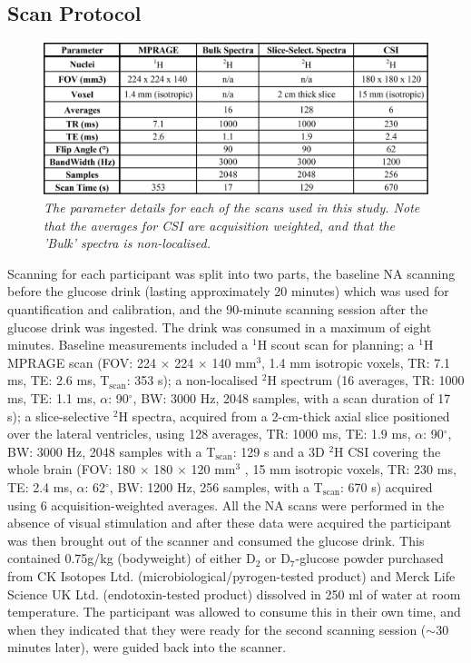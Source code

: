 \subsection{Scan Protocol}

\begin{figure}
    \centering
    \includegraphics[width = 1\textwidth]{Figures/Glucose/Scan_Details.png}
    \caption{\textit{The parameter details for each of the scans used in this study. Note that the averages for CSI are acquisition weighted, and that the 'Bulk' spectra is non-localised.}}
    \label{fig:Glu:Scan_Details}
\end{figure}

Scanning for each participant was split into two parts, the baseline \ac{NA} scanning before the glucose drink (lasting approximately 20 minutes) which was used for quantification and calibration, and the 90-minute scanning session after the glucose drink was ingested. The drink was consumed in a maximum of eight minutes. Baseline measurements included a $^1$H scout scan for planning; a $^1$H \ac{MPRAGE} scan (\ac{FOV}: 224 $\times$ 224 $\times$ 140 mm$^3$, 1.4 mm isotropic voxels, \ac{TR}: 7.1 ms, \ac{TE}: 2.6 ms, T$_\text{scan}$: 353 s); a non-localised $^2$H spectrum (16 averages, \ac{TR}: 1000 ms, \ac{TE}: 1.1 ms, $\alpha$: 90$^\circ$, \ac{BW}: 3000 Hz, 2048 samples, with a scan duration of 17 s); a slice-selective $^2$H spectra, acquired from a 2-cm-thick axial slice positioned over the lateral ventricles, using 128 averages, TR: 1000 ms, TE: 1.9 ms, $\alpha$: 90$^\circ$, \ac{BW}: 3000 Hz,  2048 samples with a T$_\text{scan}$: 129 s and a 3D $^2$H \ac{CSI} covering the whole brain (\ac{FOV}: 180 $\times$ 180 $\times$ 120 mm$^3$ , 15 mm isotropic voxels, \ac{TR}: 230 ms, \ac{TE}: 2.4 ms, $\alpha$: 62$^\circ$, \ac{BW}: 1200 Hz, 256 samples, with a T$_\text{scan}$: 670 s) acquired using 6 acquisition-weighted \cite{Pohmann2001AccurateCSI} averages. All the \ac{NA} scans were performed in the absence of visual stimulation and after these data were acquired the participant was then brought out of the scanner and consumed the glucose drink. This contained 0.75g/kg (bodyweight) of either D$_2$ or D$_7$-glucose powder purchased from CK Isotopes Ltd. (microbiological/pyrogen-tested product) and Merck Life Science UK Ltd. (endotoxin-tested product) dissolved in 250 ml of water at room temperature. The participant was allowed to consume this in their own time, and when they indicated that they were ready for the second scanning session ($\sim$30 minutes later), were guided back into the scanner.


